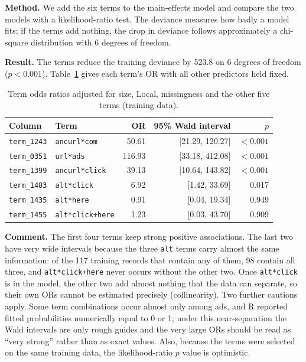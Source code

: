 \textbf{Method.} We add the six terms to the main-effects model and compare
the two models with a likelihood-ratio test. The deviance measures how badly
a model fits; if the terms add nothing, the drop in deviance follows
approximately a chi-square distribution with 6 degrees of freedom.

\textbf{Result.} The terms reduce the training deviance by 523.8 on 6
degrees of freedom ($p<0.001$). Table~\ref{tab:infer-term-or} gives each
term's OR with all other predictors held fixed.

\begin{table}[htbp]
\centering
\caption{Term odds ratios adjusted for size, Local, missingness and the other five terms (training data).}
\label{tab:infer-term-or}
\begin{tabular}{llrrr}
\toprule
Column & Term & OR & 95\% Wald interval & $p$\\
\midrule
\texttt{term\_1243} & \texttt{ancurl*com} & 50.61 & [21.29, 120.27] & $<0.001$\\
\texttt{term\_0351} & \texttt{url*ads} & 116.93 & [33.18, 412.08] & $<0.001$\\
\texttt{term\_1399} & \texttt{ancurl*click} & 39.13 & [10.64, 143.82] & $<0.001$\\
\texttt{term\_1483} & \texttt{alt*click} & 6.92 & [1.42, 33.69] & 0.017\\
\texttt{term\_1435} & \texttt{alt*here} & 0.91 & [0.04, 19.34] & 0.949\\
\texttt{term\_1455} & \texttt{alt*click+here} & 1.23 & [0.03, 43.70] & 0.909\\
\bottomrule
\end{tabular}
\end{table}

\textbf{Comment.} The first four terms keep strong positive associations.
The last two have very wide intervals because the three \texttt{alt} terms
carry almost the same information: of the 117 training records that contain
any of them, 98 contain all three, and \texttt{alt*click+here} never occurs
without the other two. Once \texttt{alt*click} is in the model, the other two
add almost nothing that the data can separate, so their own ORs cannot be
estimated precisely (collinearity). Two further cautions apply. Some term
combinations occur almost only among ads, and R reported fitted
probabilities numerically equal to 0 or 1; under this near-separation the
Wald intervals are only rough guides and the very large ORs should be read
as ``very strong'' rather than as exact values. Also, because the terms were
selected on the same training data, the likelihood-ratio $p$ value is
optimistic.

